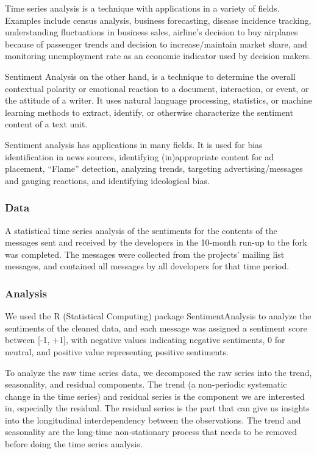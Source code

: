 \documentclass[12pt]{report}
\begin{document}
Time series analysis is a technique with applications in a variety of fields. Examples include census analysis, business forecasting, disease incidence tracking, understanding fluctuations in business sales, airline's decision to buy airplanes because of passenger trends and
decision to increase/maintain market share, and monitoring unemployment rate as an economic indicator used by decision makers.

Sentiment Analysis on the other hand, is a technique to determine the overall contextual polarity or emotional reaction to a document, interaction, or event, or the attitude of a writer. It uses natural language processing, statistics, or machine learning methods to extract, identify, or otherwise characterize the sentiment content of a text unit. 

Sentiment analysis has applications in many fields. It is used for bias identification in news sources, identifying (in)appropriate content for ad placement, ``Flame'' detection, analyzing trends, targeting advertising/messages and gauging reactions, and identifying ideological bias.

\subsubsection{Data}
A statistical time series analysis of the sentiments for the contents of the messages sent and received by the developers in the 10-month run-up to the fork was completed. The messages were collected from the projects' mailing list messages, and contained all messages by all developers for that time period.

\subsubsection{Analysis}
We used the R (Statistical Computing) \cite{R} package SentimentAnalysis \cite{Feuer}\cite{Proel} to analyze the sentiments of the cleaned data, and each message was assigned a sentiment score between [-1, +1], with negative values indicating negative sentiments, 0 for neutral, and positive value representing positive sentiments. 

To analyze the raw time series data, we decomposed the raw series into the trend, seasonality, and residual components. The trend (a non-periodic systematic change in the time series) and residual series is the component we are interested in, especially the residual. The residual series is the part that can give us insights into the longitudinal interdependency between the observations. The trend and seasonality are the long-time non-stationary process that needs to be removed before doing the time series analysis.
\end{document}

